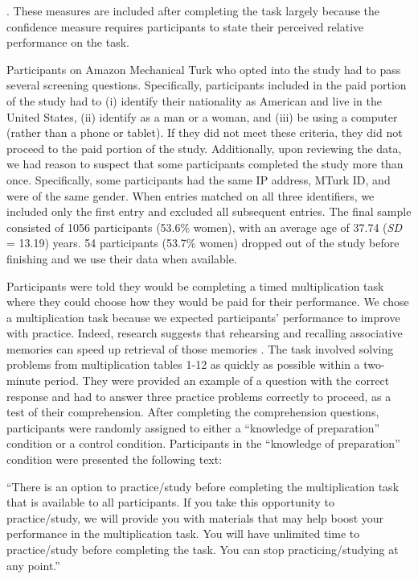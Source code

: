 \documentclass[a4paper,nobind]{templates/ociamthesis}
\begin{document}
\autocite{Dohmen2011b}. These measures are included after completing the task largely because the confidence measure requires participants to state their perceived relative performance on the task.

Participants on Amazon Mechanical Turk who opted into the study had to pass several screening questions. Specifically, participants included in the paid portion of the study had to (i) identify their nationality as American and live in the United States, (ii) identify as a man or a woman, and (iii) be using a computer (rather than a phone or tablet). If they did not meet these criteria, they did not proceed to the paid portion of the study. Additionally, upon reviewing the data, we had reason to suspect that some participants completed the study more than once. Specifically, some participants had the same IP address, MTurk ID, and were of the same gender. When entries matched on all three identifiers, we included only the first entry and excluded all subsequent entries. The final sample consisted of 1056 participants (53.6\% women), with an average age of 37.74 (\emph{SD} = 13.19) years. 54 participants (53.7\% women) dropped out of the study before finishing and we use their data when available.

Participants were told they would be completing a timed multiplication task where they could choose how they would be paid for their performance. We chose a multiplication task because we expected participants' performance to improve with practice. Indeed, research suggests that rehearsing and recalling associative memories can speed up retrieval of those memories \autocite{Rundus1971}. The task involved solving problems from multiplication tables 1-12 as quickly as possible within a two-minute period. They were provided an example of a question with the correct response and had to answer three practice problems correctly to proceed, as a test of their comprehension. After completing the comprehension questions, participants were randomly assigned to either a ``knowledge of preparation'' condition or a control condition. Participants in the ``knowledge of preparation'' condition were presented the following text:

``There is an option to practice/study before completing the multiplication task that is available to all participants. If you take this opportunity to practice/study, we will provide you with materials that may help boost your performance in the multiplication task. You will have unlimited time to practice/study before completing the task. You can stop practicing/studying at any point.''
\end{document}
